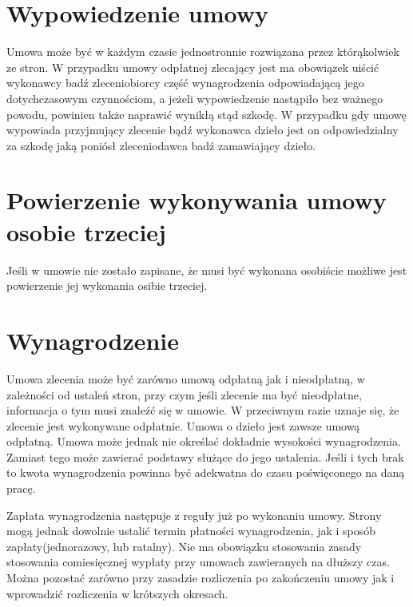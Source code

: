 \section[Wypowiedzenie umowy][Wypowiedzenie umowy]{Wypowiedzenie umowy}
Umowa może być w każdym czasie jednostronnie rozwiązana przez którąkolwiek ze stron. W przypadku umowy odpłatnej zlecający jest ma obowiązek uiścić wykonawcy badź zleceniobiorcy część wynagrodzenia odpowiadającą jego dotychczasowym czynnościom, a jeżeli wypowiedzenie nastąpiło bez ważnego powodu, powinien także naprawić wynikłą stąd szkodę. W przypadku gdy umowę wypowiada przyjmujący zlecenie bądź wykonawca dzieło jest on odpowiedzialny za szkodę jaką poniósł zleceniodawca badź zamawiający dzieło.

\section[Powierzenie wykonywania umowy osobie trzeciej][Powierzenie wykonywania umowy osobie trzeciej]{Powierzenie wykonywania umowy osobie trzeciej}
Jeśli w umowie nie zostało zapisane, że musi być wykonana osobiście możliwe jest powierzenie jej wykonania osibie trzeciej.

\section[Wynagrodzenie][Wynagrodzenie]{Wynagrodzenie}
Umowa zlecenia może być zarówno umową odpłatną jak i nieodpłatną, w zależności od ustaleń stron, przy czym jeśli zlecenie ma być nieodpłatne, informacja o tym musi znaleźć się w umowie. W przeciwnym razie uznaje się, że zlecenie jest wykonywane odpłatnie. Umowa o dzieło jest zawsze umową odpłatną. Umowa może jednak nie określać dokładnie wysokości wynagrodzenia. Zamiast tego może zawierać podstawy służące do jego ustalenia. Jeśli i tych brak to kwota wynagrodzenia powinna być adekwatna do czasu poświęconego na daną pracę.

Zapłata wynagrodzenia następuje z reguły już po wykonaniu umowy. Strony mogą jednak dowolnie ustalić termin płatności wynagrodzenia, jak i sposób zapłaty(jednorazowy, lub ratalny). Nie ma obowiązku stosowania zasady stosowania comiesięcznej wypłaty przy umowach zawieranych na dłuższy czas. Można pozostać zarówno przy zasadzie rozliczenia po zakończeniu umowy jak i wprowadzić rozliczenia w krótszych okresach.

